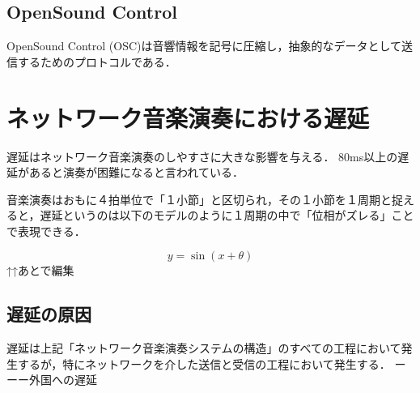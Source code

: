 \subsection{OpenSound Control}
OpenSound Control (OSC)は音響情報を記号に圧縮し，抽象的なデータとして送信するためのプロトコルである．

\section{ネットワーク音楽演奏における遅延}
遅延はネットワーク音楽演奏のしやすさに大きな影響を与える．
80ms以上の遅延があると演奏が困難になると言われている．

音楽演奏はおもに４拍単位で「１小節」と区切られ，その１小節を１周期と捉えると，遅延というのは以下のモデルのように１周期の中で「位相がズレる」ことで表現できる．

\begin{displaymath}
  y = \sin(x + \theta)
\end{displaymath}
↑↑あとで編集

\subsection{遅延の原因}
遅延は上記「ネットワーク音楽演奏システムの構造」のすべての工程において発生するが，特にネットワークを介した送信と受信の工程において発生する．
ーーー外国への遅延
